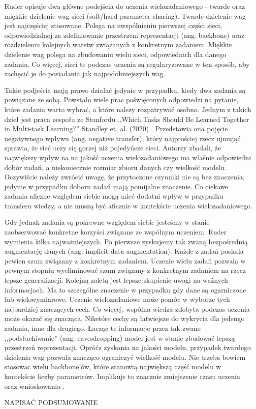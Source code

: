Ruder opisuje dwa główne podejścia do uczenia wielozadaniowego - twarde oraz miękkie dzielenie wag sieci (soft/hard parameter sharing). Twarde dzielenie wag jest najczęściej stosowane. Polega na uwspólnieniu pierwszej części sieci, odpowiedzialnej za zdefiniowanie przestrzeni reprezentacji (ang. backbone) oraz rozdzieleniu kolejnych warstw związanych z konkretnym zadaniem. Miękkie dzielenie wag polega na zbudowaniu wielu sieci, odpowiednich dla danego zadania. Co więcej, sieci te podczas uczenia są regularyzowane w ten sposób, aby zachęcić je do posiadania jak najpodobniejszych wag.

Takie podjeścia mają prawo działać jedynie w przypadku, kiedy dwa zadania są powiązane ze sobą. Powstało wiele prac poświęconych odpowiedzi na pytanie, które zadania warto wybrać, a które należy rozpatrywać osobno. Jednym z takich dzieł jest praca zespołu ze Stanfordu ,,Which Tasks Should Be Learned Together in Multi-task Learning?'' Standley et. al. (2020) \cite{standley2020tasks}. Przedstawia ona pojęcie negatywnego wpływu (ang. negative transfer), który najprościej rzecz ujmująć sprawia, że sieć uczy się gorzej niż pojedyńcze sieci. Autorzy zbadali, że największy wpływ na na jakość uczenia wielozadaniowego ma właśnie odpowiedni dobór zadań, a niekoniecznie rozmiar zbioru danych czy wielkość modelu. Oczywiście należy zwrócić uwagę, że przytoczone czynniki nie są bez znaczenia, jedynie w przypadku doboru zadań mają pomijalne znaczenie. Co ciekawe zadania aficzne względem siebie mogą mieć dodatni wpływ w przypadku transferu wiedzy, a nie muszą być aficznie w kontekście uczenia wielozadaniowego.

Gdy jednak zadania są pokrewne względem siebie jesteśmy w stanie zaobserwować konkretne korzyści związane ze wspólnym uczeniem. Ruder wymienia kilka najważniejszych. Po pierwsze zyskujemy tak zwaną bezpośrednią augmentację danych (ang. implicit data augmentation). Każde z zadań posiada pewien szum związany z konkretnym zadaniem. Uczenie wielu zadań pozwala w pewnym stopniu wyeliminować szum związany z konkretnym zadaniem na rzecz lepsze generalizacji. Kolejną zaletą jest lepsze skupienie uwagi na ważnych informacjach. Ma to szczególne znaczenie w przypadku gdy dane są ogarniczone lub wielowymiarowe. Uczenie wielozadaniowe może pomóc w wyborze tych najbardziej znaczących cech. Co więcej, wspólna wiedza zdobyta podczas uczenia może okazać się znacząca. Niketóre cechy są łatwiejsze do wykrycia dla jedengo zadania, inne dla drugiego. Łacząc te informacje przez tak zwane ,,podsłuchiwanie'' (ang. eavesdropping) model jest w stanie zbudować lepszą przestrzeń reprezentacji. Opróćz zyskania na jakości modelu, przypadek twardego dzielenia wag pozwala znacząco ograniczyć wielkość modelu. Nie trzeba bowiem stosowac wielu backbone'ów, które stanowią największą część modelu w kontekście liczby parametrów. Implikuje to znacznie zmiejszenie czasu uczenia oraz wnioskowania \cite{standley2020tasks}.

NAPISAĆ PODSUMOWANIE
